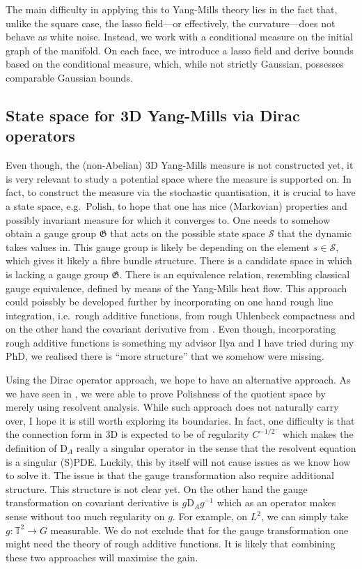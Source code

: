 \documentclass[11pt]{article}
\numberwithin{equation}{section}
\theoremstyle{definition}
\theoremstyle{remark}
\newcommand{\1}{\mathbf 1}
\newcommand{\<}{\langle}
\renewcommand{\>}{\rangle}
\newcommand{\cS}{\mathcal S}
\newcommand{\rmD}{\mathrm{D}}
\newcommand{\fG}{\mathfrak{G}}
\newcommand{\bT}{\mathbb T}
\begin{document}
The main difficulty in applying this to Yang-Mills theory lies in the fact that, unlike the square case, the lasso field—or effectively, the curvature—does not behave as white noise. Instead, we work with a conditional measure on the initial graph of the manifold. On each face, we introduce a lasso field and derive bounds based on the conditional measure, which, while not strictly Gaussian, possesses comparable Gaussian bounds.
%
\subsection{State space for 3D Yang-Mills via Dirac operators}
%
Even though, the (non-Abelian) 3D Yang-Mills measure is not constructed yet, it is very relevant to study a potential space where the measure is supported on. In fact, to construct the measure via the stochastic quantisation, it is crucial to have a state space, e.g.\ Polish, to hope that one has nice (Markovian) properties and possibly invariant measure for which it converges to. One needs to somehow obtain a gauge group $\fG$ that acts on the possible state space $\cS$ that the dynamic takes values in. This gauge group is likely be depending on the element $s\in\cS$, which gives it likely a fibre bundle structure. There is a candidate space in \cite{CCHS3d} which is lacking a gauge group $\fG$. There is an equivalence relation, resembling classical gauge equivalence, defined by means of the Yang-Mills heat flow. This approach could poissbly be developed further by incorporating on one hand rough line integration, i.e.\ rough additive functions, from rough Uhlenbeck compactness and on the other hand the covariant derivative from . Even though, incorporating rough additive functions is something my advisor Ilya and I have tried during my PhD, we realised there is ``more structure'' that we somehow were missing. 

Using the Dirac operator approach, we hope to have an alternative approach. As we have seen in , we were able to prove Polishness of the quotient space by merely using resolvent analysis. While such approach does not naturally carry over, I hope it is still worth exploring its boundaries. In fact, one difficulty is that the connection form in 3D is expected to be of regularity $C^{-1/2^-}$ which makes the definition of $\rmD_A$ really a singular operator in the sense that the resolvent equation is a singular (S)PDE. Luckily, this by itself will not cause issues as we know how to solve it. The issue is that the gauge transformation also require additional structure. This structure is not clear yet. On the other hand the gauge transformation on covariant derivative is $g\rmD_Ag^{-1}$ which as an operator makes sense without too much regularity on $g$. For example, on $L^2$, we can simply take $g:\bT^2\to G$ measurable. We do not exclude that for the gauge transformation one might need the theory of rough additive functions. It is likely that combining these two approaches will maximise the gain. 
\end{document}
